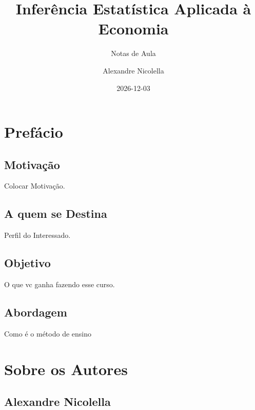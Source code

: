 \documentclass[
  letterpaper,
  DIV=11,
  numbers=noendperiod]{scrreprt}
\title{Inferência Estatística Aplicada à Economia}
\subtitle{Notas de Aula}
\author{Alexandre Nicolella}
\date{2026-12-03}
\renewcommand*\contentsname{Table of contents}
\newcommand\contentsname{Table of contents}
\begin{document}
\maketitle

\renewcommand*\contentsname{Table of contents}
{
\hypersetup{linkcolor=}
\setcounter{tocdepth}{2}
\tableofcontents
}


\chapter{Prefácio}\label{prefuxe1cio}

\section{\texorpdfstring{\textbf{Motivação}}{Motivação}}\label{motivauxe7uxe3o}

Colocar Motivação.

\section{\texorpdfstring{\textbf{A quem se
Destina}}{A quem se Destina}}\label{a-quem-se-destina}

Perfil do Interessado.

\section{\texorpdfstring{\textbf{Objetivo}}{Objetivo}}\label{objetivo}

O que vc ganha fazendo esse curso.

\section{\texorpdfstring{\textbf{Abordagem}}{Abordagem}}\label{abordagem}

Como é o método de ensino


\chapter{Sobre os Autores}\label{sobre-os-autores}

\section{\texorpdfstring{\textbf{Alexandre
Nicolella}}{Alexandre Nicolella}}\label{alexandre-nicolella}
\end{document}

